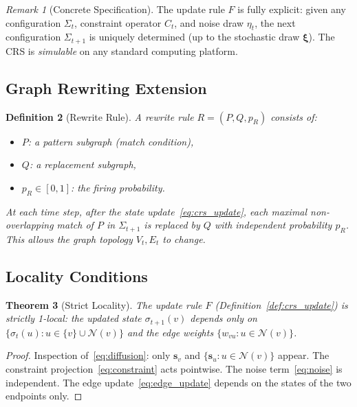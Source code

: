 \documentclass[11pt,a4paper]{article}
\newtheorem{definition}{Definition}[section]
\newtheorem{theorem}[definition]{Theorem}
\theoremstyle{remark}
\newtheorem{remark}[definition]{Remark}
\begin{document}
\begin{remark}[Concrete Specification]
The update rule $F$ is fully explicit: given any configuration
$\Sigma_t$, constraint operator $C_t$, and noise draw $\eta_t$,
the next configuration $\Sigma_{t+1}$ is uniquely determined (up to
the stochastic draw $\boldsymbol{\xi}$).  The CRS is \emph{simulable}
on any standard computing platform.
\end{remark}

\subsection{Graph Rewriting Extension}

\begin{definition}[Rewrite Rule]
\label{def:rewrite}
A \emph{rewrite rule} $R = (P, Q, p_R)$ consists of:
\begin{itemize}
  \item $P$: a \emph{pattern subgraph} (match condition),
  \item $Q$: a \emph{replacement subgraph},
  \item $p_R \in [0,1]$: the firing probability.
\end{itemize}
At each time step, after the state update~\eqref{eq:crs_update},
each maximal non-overlapping match of $P$ in $\Sigma_{t+1}$ is
replaced by $Q$ with independent probability $p_R$.  This allows
the graph topology $V_t, E_t$ to change.
\end{definition}

\subsection{Locality Conditions}

\begin{theorem}[Strict Locality]
\label{thm:locality}
The update rule $F$ (Definition~\ref{def:crs_update}) is
\emph{strictly 1-local}: the updated state $\sigma_{t+1}(v)$ depends
only on $\{\sigma_t(u) : u \in \{v\} \cup \mathcal{N}(v)\}$ and the
edge weights $\{w_{vu} : u \in \mathcal{N}(v)\}$.
\end{theorem}

\begin{proof}
Inspection of~\eqref{eq:diffusion}: only $\mathbf{s}_v$ and
$\{\mathbf{s}_u : u \in \mathcal{N}(v)\}$ appear.  The constraint
projection~\eqref{eq:constraint} acts pointwise.  The noise
term~\eqref{eq:noise} is independent.  The edge
update~\eqref{eq:edge_update} depends on the states of the two
endpoints only.
\end{proof}
\end{document}
